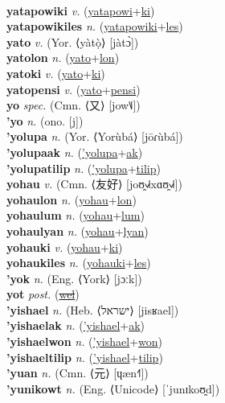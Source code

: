 \label{yatapowinules} \\
\textbf{yatapowiki} \textit{v.} (\hyperref[yatapowi]{yatapowi}+\hyperref[ki]{ki})
 \label{yatapowiki} \\
\textbf{yatapowikiles} \textit{n.} (\hyperref[yatapowiki]{yatapowiki}+\hyperref[les]{les})
 \label{yatapowikiles} \\
\textbf{yato} \textit{v.} (Yor. ⟨yàtọ̀⟩ [jàtɔ̀])
 \label{yato} \\
\textbf{yatolon} \textit{n.} (\hyperref[yato]{yato}+\hyperref[lon]{lon})
 \label{yatolon} \\
\textbf{yatoki} \textit{v.} (\hyperref[yato]{yato}+\hyperref[ki]{ki})
 \label{yatoki} \\
\textbf{yatopensi} \textit{v.} (\hyperref[yato]{yato}+\hyperref[pensi]{pensi})
 \label{yatopensi} \\
\textbf{yo} \textit{spec.} (Cmn. ⟨又⟩ [jow˥˩])
 \label{yo} \\
\textbf{'yo} \textit{n.} (ono. [j])
 \label{'yo} \\
\textbf{'yolupa} \textit{n.} (Yor. ⟨Yorùbá⟩ [jōɾùbá])
 \label{'yolupa} \\
\textbf{'yolupaak} \textit{n.} (\hyperref['yolupa]{'yolupa}+\hyperref[ak]{ak})
 \label{'yolupaak} \\
\textbf{'yolupatilip} \textit{n.} (\hyperref['yolupa]{'yolupa}+\hyperref[tilip]{tilip})
 \label{'yolupatilip} \\
\textbf{yohau} \textit{v.} (Cmn. ⟨友好⟩ [joʊ̯˧˩˧xɑʊ̯˧˩˧])
 \label{yohau} \\
\textbf{yohaulon} \textit{n.} (\hyperref[yohau]{yohau}+\hyperref[lon]{lon})
 \label{yohaulon} \\
\textbf{yohaulum} \textit{n.} (\hyperref[yohau]{yohau}+\hyperref[lum]{lum})
 \label{yohaulum} \\
\textbf{yohaulyan} \textit{n.} (\hyperref[yohau]{yohau}+\hyperref[lyan]{lyan})
 \label{yohaulyan} \\
\textbf{yohauki} \textit{v.} (\hyperref[yohau]{yohau}+\hyperref[ki]{ki})
 \label{yohauki} \\
\textbf{yohaukiles} \textit{n.} (\hyperref[yohauki]{yohauki}+\hyperref[les]{les})
 \label{yohaukiles} \\
\textbf{'yok} \textit{n.} (Eng. ⟨York⟩ [jɔːk])
 \label{'yok} \\
\textbf{yot} \textit{post.} (\hyperref[wel]{\sout{wel}})
 \label{yot} \\
\textbf{'yishael} \textit{n.} (Heb. ⟨ישראל⟩ [jisʁael])
 \label{'yishael} \\
\textbf{'yishaelak} \textit{n.} (\hyperref['yishael]{'yishael}+\hyperref[ak]{ak})
 \label{'yishaelak} \\
\textbf{'yishaelwon} \textit{n.} (\hyperref['yishael]{'yishael}+\hyperref[won]{won})
 \label{'yishaelwon} \\
\textbf{'yishaeltilip} \textit{n.} (\hyperref['yishael]{'yishael}+\hyperref[tilip]{tilip})
 \label{'yishaeltilip} \\
\textbf{'yuan} \textit{n.} (Cmn. ⟨元⟩ [ɥæn˧˥])
 \label{'yuan} \\
\textbf{'yunikowt} \textit{n.} (Eng. ⟨Unicode⟩ [ˈjunɪkoʊ̯d])
 \label{'yunikowt} \\
